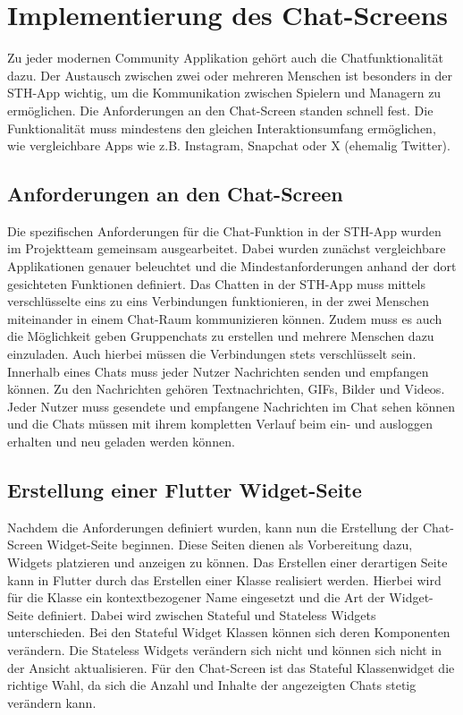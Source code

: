 \section{Implementierung des Chat-Screens}
Zu jeder modernen Community Applikation gehört auch die Chatfunktionalität dazu. Der Austausch zwischen zwei oder mehreren Menschen ist besonders in der STH-App wichtig, um die Kommunikation zwischen Spielern und Managern zu ermöglichen. Die Anforderungen an den Chat-Screen standen schnell fest. Die Funktionalität muss mindestens den gleichen Interaktionsumfang ermöglichen, wie vergleichbare Apps wie z.B. Instagram, Snapchat oder X (ehemalig Twitter).

\subsection{Anforderungen an den Chat-Screen}
Die spezifischen Anforderungen für die Chat-Funktion in der STH-App wurden im Projektteam gemeinsam ausgearbeitet. Dabei wurden zunächst vergleichbare Applikationen genauer beleuchtet und die Mindestanforderungen anhand der dort gesichteten Funktionen definiert. Das Chatten in der STH-App muss mittels verschlüsselte eins zu eins Verbindungen funktionieren, in der zwei Menschen miteinander in einem Chat-Raum kommunizieren können. Zudem muss es auch die Möglichkeit geben Gruppenchats zu erstellen und mehrere Menschen dazu einzuladen. Auch hierbei müssen die Verbindungen stets verschlüsselt sein. Innerhalb eines Chats muss jeder Nutzer Nachrichten senden und empfangen können. Zu den Nachrichten gehören Textnachrichten, GIFs, Bilder und Videos. Jeder Nutzer muss gesendete und empfangene Nachrichten im Chat sehen können und die Chats müssen mit ihrem kompletten Verlauf beim ein- und ausloggen erhalten und neu geladen werden können.

\subsection{Erstellung einer Flutter Widget-Seite}
Nachdem die Anforderungen definiert wurden, kann nun die Erstellung der Chat-Screen Widget-Seite beginnen. Diese Seiten dienen als Vorbereitung dazu, Widgets platzieren und anzeigen zu können. Das Erstellen einer derartigen Seite kann in Flutter durch das Erstellen einer Klasse realisiert werden. Hierbei wird für die Klasse ein kontextbezogener Name eingesetzt und die Art der Widget-Seite definiert. Dabei wird zwischen Stateful und Stateless Widgets unterschieden. Bei den Stateful Widget Klassen können sich deren Komponenten verändern. Die Stateless Widgets verändern sich nicht und können sich nicht in der Ansicht aktualisieren. Für den Chat-Screen ist das Stateful Klassenwidget die richtige Wahl, da sich die Anzahl und Inhalte der angezeigten Chats stetig verändern kann.

